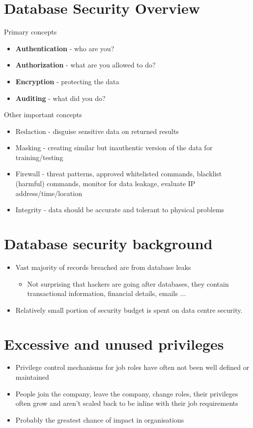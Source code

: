 \documentclass{article}[18pt]
\begin{document}
\section{Database Security Overview}
Primary concepts
\begin{itemize}
	\item \textbf{Authentication} - who are you?
	\item \textbf{Authorization} - what are you allowed to do?
	\item \textbf{Encryption} - protecting the data
	\item \textbf{Auditing} - what did you do?
\end{itemize}
Other important concepts
\begin{itemize}
	\item Redaction - disguise sensitive data on returned results
	\item Masking - creating similar but inauthentic version of the data for training/testing
	\item Firewall - threat patterns, approved whitelisted commands, blacklist (harmful) commands, monitor for data leakage, evaluate IP address/time/location
	\item Integrity - data should be accurate and tolerant to physical problems
\end{itemize}
\section{Database security background}
\begin{itemize}
	\item Vast majority of records breached are from database leaks
	\begin{itemize}
		\item Not surprising that hackers are going after databases, they contain transactional information, financial details, emails ...
	\end{itemize}
	\item Relatively small portion of security budget is spent on data centre security.
\end{itemize}
\section{Excessive and unused privileges}
\begin{itemize}
	\item Privilege control mechanisms for job roles have often not been well defined or maintained
	\item People join the company, leave the company, change roles, their privileges often grow and aren't scaled back to be inline with their job requirements
	\item Probably the greatest chance of impact in organisations
\end{itemize}
\end{document}

